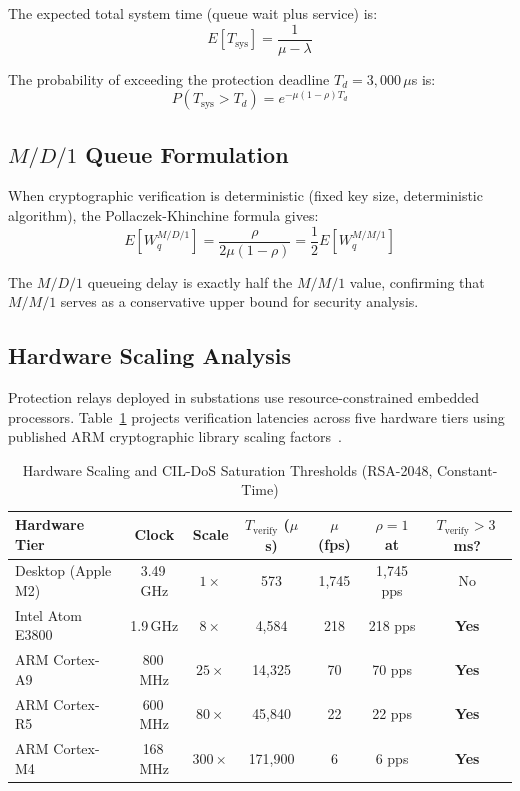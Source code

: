 \documentclass[journal]{IEEEtran}
\begin{document}
The expected total system time (queue wait plus service) is:
\begin{equation}
E[T_{\text{sys}}] = \frac{1}{\mu - \lambda}
\end{equation}

The probability of exceeding the protection deadline $T_d = 3{,}000\,\mu$s is:
\begin{equation}
P(T_{\text{sys}} > T_d) = e^{-\mu(1-\rho)T_d}
\label{eq:viol_mm1}
\end{equation}

\subsection{$M/D/1$ Queue Formulation}
When cryptographic verification is deterministic (fixed key size, deterministic algorithm), the Pollaczek-Khinchine formula gives:
\begin{equation}
E[W_q^{M/D/1}] = \frac{\rho}{2\mu(1-\rho)} = \frac{1}{2} E[W_q^{M/M/1}]
\end{equation}

The $M/D/1$ queueing delay is exactly half the $M/M/1$ value, confirming that $M/M/1$ serves as a conservative upper bound for security analysis.

\subsection{Hardware Scaling Analysis}
Protection relays deployed in substations use resource-constrained embedded processors. Table~\ref{tab:hw_scaling} projects verification latencies across five hardware tiers using published ARM cryptographic library scaling factors~\cite{arm_cortex_m4, arm_cortex_r5, ali2020latency}.

\begin{table}[t]
\caption{Hardware Scaling and CIL-DoS Saturation Thresholds (RSA-2048, Constant-Time)}
\label{tab:hw_scaling}
\centering
\begin{tabular}{lcccccc}
\toprule
\textbf{Hardware Tier} & \textbf{Clock} & \textbf{Scale} & \textbf{$T_{\text{verify}}$ ($\mu$s)} & \textbf{$\mu$ (fps)} & \textbf{$\rho = 1$ at} & \textbf{$T_{\text{verify}} > 3$\,ms?} \\
\midrule
Desktop (Apple M2)     & 3.49\,GHz & $1\times$    & 573     & 1,745   & 1,745 pps & No \\
Intel Atom E3800       & 1.9\,GHz  & $8\times$    & 4,584   & 218     & 218 pps   & \textbf{Yes} \\
ARM Cortex-A9          & 800\,MHz  & $25\times$   & 14,325  & 70      & 70 pps    & \textbf{Yes} \\
ARM Cortex-R5          & 600\,MHz  & $80\times$   & 45,840  & 22      & 22 pps    & \textbf{Yes} \\
ARM Cortex-M4          & 168\,MHz  & $300\times$  & 171,900 & 6       & 6 pps     & \textbf{Yes} \\
\bottomrule
\end{tabular}
\end{table}
\end{document}
